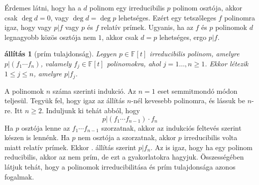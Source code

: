 \documentclass[a4paper, showtrims]{memoir}
\makeatletter
\renewenvironment{proof}[1][\proofname]
    {\par\pushQED{\qed}%
    \normalfont \topsep6\p@\@plus6\p@\relax
    \trivlist
    \item[\hskip\labelsep
        \itshape
    #1\@addpunct{:}]\ignorespaces}
    {\popQED\endtrivlist\@endpefalse}
\theoremstyle{plain}
\newtheorem{proposition}{állítás}[chapter]
\theoremstyle{remark}
\theoremstyle{definition}
\makeatother
\begin{document}
Érdemes látni,
hogy ha a $d$ polinom egy irreducibilis $p$ polinom osztója,
akkor csak
$\deg d=0$, vagy $\deg d=\deg p$ lehetséges.
Ezért egy tetszőleges $f$ polinomra igaz, hogy
vagy $p|f$ vagy $p$ és $f$ relatív prímek.
Ugyanis,
ha az $f$ és $p$ polinomok $d$ legnagyobb közös osztója nem $1$,
akkor csak $d=p$ lehetséges, ergo $p|f$.
\begin{proposition}[prím tulajdonság]
	Legyen $p\in\mathbb{F}\left[ t \right]$ irreducibilis polinom, amelyre
	$p|(f_1\cdots f_n)$, valamely $f_j\in\mathbb{F}\left[ t \right]$ polinomokra, ahol $j=1\dots,n\geq 1$.
	Ekkor létezik $1\leq j\leq n$, amelyre $p|f_j$.\qedhere
\end{proposition}
\begin{proof}
	A polinomok $n$ száma szerinti indukció.
	Az $n=1$ eset semmitmondó módon teljesül.
	Tegyük fel, hogy igaz az állítás $n$-nél kevesebb polinomra,
	és lássuk be $n$-re. Itt $n\geq 2$.
	Induljunk ki tehát abból, hogy
	\[
		p|\left( f_1\cdots f_{n-1} \right)\cdot f_n
	\]
	Ha $p$ osztója lenne az $f_1\cdots f_{n-1}$ szorzatnak,
	akkor az indukciós feltevés szerint készen is lennénk.
	Ha $p$ nem osztója a szorzatnak,
	akkor $p$ irreducibilis volta miatt relatív prímek.
    Ekkor . állítás  szerint $p|f_n$.
\end{proof}
Az is igaz, hogy ha egy polinom reducibilis, akkor az nem prím, de ezt a gyakorlatokra hagyjuk.
Összességében látjuk tehát,
hogy a polinomok irreducibilitása és prím tulajdonsága azonos fogalmak.
\end{document}
